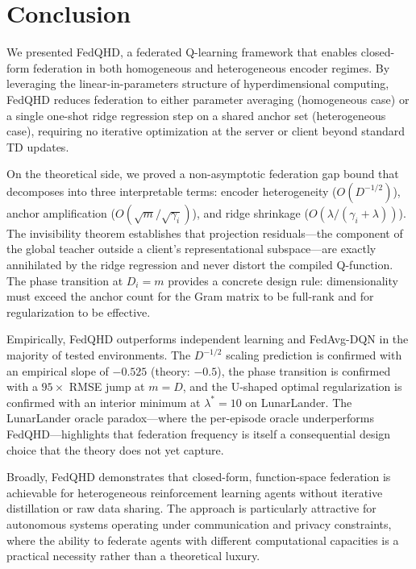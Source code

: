 \section{Conclusion}
\label{sec:conclusion}

We presented FedQHD, a federated Q-learning framework that enables closed-form federation in both homogeneous and heterogeneous encoder regimes. By leveraging the linear-in-parameters structure of hyperdimensional computing, FedQHD reduces federation to either parameter averaging (homogeneous case) or a single one-shot ridge regression step on a shared anchor set (heterogeneous case), requiring no iterative optimization at the server or client beyond standard TD updates.

On the theoretical side, we proved a non-asymptotic federation gap bound that decomposes into three interpretable terms: encoder heterogeneity ($O(D^{-1/2})$), anchor amplification ($O(\sqrt{m}/\sqrt{\gamma_i})$), and ridge shrinkage ($O(\lambda/(\gamma_i + \lambda))$). The invisibility theorem establishes that projection residuals—the component of the global teacher outside a client's representational subspace—are exactly annihilated by the ridge regression and never distort the compiled Q-function. The phase transition at $D_i = m$ provides a concrete design rule: dimensionality must exceed the anchor count for the Gram matrix to be full-rank and for regularization to be effective.

Empirically, FedQHD outperforms independent learning and FedAvg-DQN in the majority of tested environments. The $D^{-1/2}$ scaling prediction is confirmed with an empirical slope of $-0.525$ (theory: $-0.5$), the phase transition is confirmed with a $95\times$ RMSE jump at $m=D$, and the U-shaped optimal regularization is confirmed with an interior minimum at $\lambda^* = 10$ on LunarLander. The LunarLander oracle paradox—where the per-episode oracle underperforms FedQHD—highlights that federation frequency is itself a consequential design choice that the theory does not yet capture.

Broadly, FedQHD demonstrates that closed-form, function-space federation is achievable for heterogeneous reinforcement learning agents without iterative distillation or raw data sharing. The approach is particularly attractive for autonomous systems operating under communication and privacy constraints, where the ability to federate agents with different computational capacities is a practical necessity rather than a theoretical luxury.

